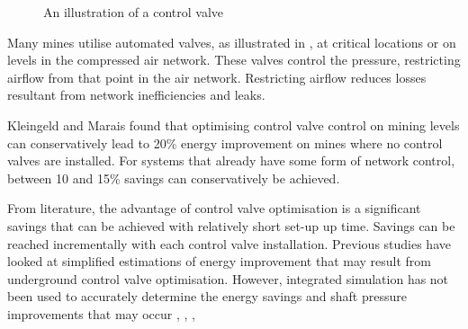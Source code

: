 		 \begin{figure}[!htbp]
		 	\centering
		 	\caption[An illustration of a control valve]{ An illustration of a control valve \cite{Kriel2014Masters}}
		 	\label{fig: Control Valve Illustration}
		 \end{figure}
		 Many mines utilise automated valves, as illustrated in , at critical locations or on levels in the compressed air network. These valves control the pressure, restricting airflow from that point in the air network. Restricting airflow reduces losses resultant from network inefficiencies and leaks.
		 \par 
		 Kleingeld and Marais \cite{kleingeld2010high} found that optimising control valve control on mining levels can conservatively lead to 20\% energy improvement on mines where no control valves are installed. For systems that already have some form of network control, between 10 and 15\% savings can conservatively be achieved.
		 \par 
		 From literature, the advantage of control valve optimisation is a significant savings that can be achieved with relatively short set-up up time. Savings can be reached incrementally with each control valve installation. Previous studies have looked at simplified estimations of energy improvement that may result from underground control valve optimisation. However, integrated simulation has not been used to accurately determine the energy savings and shaft pressure improvements that may occur \cite{kleingeld2010high}, \cite{marais2009increased}, \cite{Neser2008}, \cite{schroeder2009energy} %
